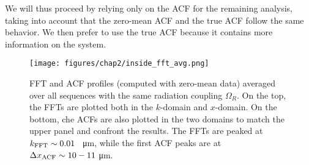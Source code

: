 We will thus proceed by relying only on the ACF for the remaining analysis, taking into account that the zero-mean ACF and the true ACF follow the same behavior. We then prefer to use the true ACF because it contains more information on the system. 


\begin{figure}[t!]
    \centering
    \texttt{[image: figures/chap2/inside\_fft\_avg.png]}
    \caption{FFT and ACF profiles (computed with zero-mean data) averaged over all sequences with the same radiation coupling $\Omega_R$. On the top, the FFTs are plotted both in the $k$-domain and $x$-domain. On the bottom, che ACFs are also plotted in the two domains to match the upper panel and confront the results.
    The FFTs are peaked at $k_{\rm FFT} \sim 0.01$ \unit{\per\micro\meter}, while the first ACF peaks are at $\Delta x_{\rm ACF} \sim 10-11$ \unit{\micro\meter}.}
    \label{fig:inside_avg}
\end{figure}

